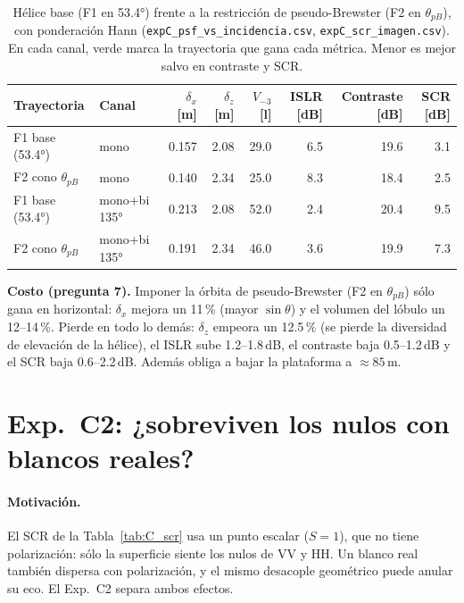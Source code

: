 \begin{table}[H]
\centering\small
\caption{Hélice base (F1 en 53.4°) frente a la restricción de pseudo-Brewster (F2 en
$\theta_{pB}$), con ponderación Hann (\texttt{expC\_psf\_vs\_incidencia.csv},
\texttt{expC\_scr\_imagen.csv}). En cada canal, \colorbox{mejor}{verde} marca la trayectoria que
gana cada métrica. Menor es mejor salvo en contraste y SCR.}
\label{tab:C_costo}
\begin{tabular}{@{}llrrrrrr@{}}
\toprule
Trayectoria & Canal & $\delta_x$ [m] & $\delta_z$ [m] & $V_{-3}$ [l] & ISLR [dB] & Contraste [dB] & SCR [dB] \\
\midrule
F1 base (53.4°) & mono & 0.157 & \cellcolor{mejor}2.08 & 29.0 & \cellcolor{mejor}6.5 & \cellcolor{mejor}19.6 & \cellcolor{mejor}3.1 \\
F2 cono $\theta_{pB}$ & mono & \cellcolor{mejor}0.140 & 2.34 & \cellcolor{mejor}25.0 & 8.3 & 18.4 & 2.5 \\
\midrule
F1 base (53.4°) & mono+bi 135° & 0.213 & \cellcolor{mejor}2.08 & 52.0 & \cellcolor{mejor}2.4 & \cellcolor{mejor}20.4 & \cellcolor{mejor}9.5 \\
F2 cono $\theta_{pB}$ & mono+bi 135° & \cellcolor{mejor}0.191 & 2.34 & \cellcolor{mejor}46.0 & 3.6 & 19.9 & 7.3 \\
\bottomrule
\end{tabular}
\end{table}

\textbf{Costo (pregunta 7).} Imponer la órbita de pseudo-Brewster (F2 en $\theta_{pB}$) sólo gana en
horizontal: $\delta_x$ mejora un 11\,\% (mayor $\sin\theta$) y el volumen del lóbulo un
12--14\,\%. Pierde en todo lo demás: $\delta_z$ empeora un 12.5\,\% (se pierde la diversidad de
elevación de la hélice), el ISLR sube 1.2--1.8\,dB, el contraste baja 0.5--1.2\,dB y el SCR baja
0.6--2.2\,dB. Además obliga a bajar la plataforma a $\approx85$\,m.

\section{Exp.~C2: ¿sobreviven los nulos con blancos reales?}
\label{sec:C2}

\paragraph{Motivación.} El SCR de la Tabla~\ref{tab:C_scr} usa un punto escalar ($S=1$), que no
tiene polarización: sólo la superficie siente los nulos de VV y HH. Un blanco real también
dispersa con polarización, y el mismo desacople geométrico puede anular su eco. El Exp.~C2
separa ambos efectos.

